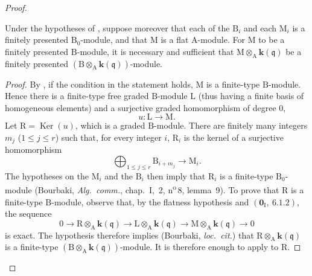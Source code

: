 \begin{proof}
\begin{corollary}[11.2.9.4]
\label{IV.11.2.9.4}
Under the hypotheses of , suppose moreover that each of the $\mathrm{B}_i$ and each $\mathrm{M}_i$ is a finitely presented $\mathrm{B}_0$-module, and that $\mathrm{M}$ is a flat $\mathrm{A}$-module. For $\mathrm{M}$ to be a finitely presented $\mathrm{B}$-module, it is necessary and sufficient that $\mathrm{M}\otimes_\mathrm{A}\boldsymbol{k}(\mathfrak{q})$ be a finitely presented $(\mathrm{B}\otimes_\mathrm{A}\boldsymbol{k}(\mathfrak{q}))$-module.
\end{corollary}

\begin{proof}
By , if the condition in the statement holds,
$\mathrm{M}$ is a finite-type $\mathrm{B}$-module. Hence there is a
finite-type free graded $\mathrm{B}$-module $\mathrm{L}$ (thus having
a finite basis of homogeneous elements) and a surjective graded
homomorphism of degree $0$,
\[
 u:\mathrm{L}\longrightarrow\mathrm{M}.
\]
Let $\mathrm{R}=\operatorname{Ker}(u)$, which is a graded
$\mathrm{B}$-module. There are finitely many integers $m_j$
($1\leqslant j\leqslant r$) such that, for every integer $i$,
$\mathrm{R}_i$ is the kernel of a surjective homomorphism
\[
 \bigoplus_{1\leqslant j\leqslant r}\mathrm{B}_{i+m_j}
 \longrightarrow \mathrm{M}_i.
\]
The hypotheses on the $\mathrm{M}_i$ and the $\mathrm{B}_i$ then
imply that $\mathrm{R}_i$ is a finite-type
$\mathrm{B}_0$-module (Bourbaki, \emph{Alg.\ comm.}, chap.~I,
\textsection\,2, n\textsuperscript{o}\,8, lemma~9). To prove that
$\mathrm{R}$ is a finite-type $\mathrm{B}$-module, observe that,
by the flatness hypothesis and $(\mathbf{0}_\mathrm{I},~6.1.2)$, the
sequence
\[
 0\longrightarrow
 \mathrm{R}\otimes_\mathrm{A}\boldsymbol{k}(\mathfrak{q})
 \longrightarrow
 \mathrm{L}\otimes_\mathrm{A}\boldsymbol{k}(\mathfrak{q})
 \longrightarrow
 \mathrm{M}\otimes_\mathrm{A}\boldsymbol{k}(\mathfrak{q})
 \longrightarrow 0
\]
is exact. The hypothesis therefore implies (Bourbaki,
\emph{loc.\ cit.}) that
$\mathrm{R}\otimes_\mathrm{A}\boldsymbol{k}(\mathfrak{q})$ is a
finite-type
$(\mathrm{B}\otimes_\mathrm{A}\boldsymbol{k}(\mathfrak{q}))$-module.
It is therefore enough to apply  to $\mathrm{R}$.
\end{proof}


\end{proof}

